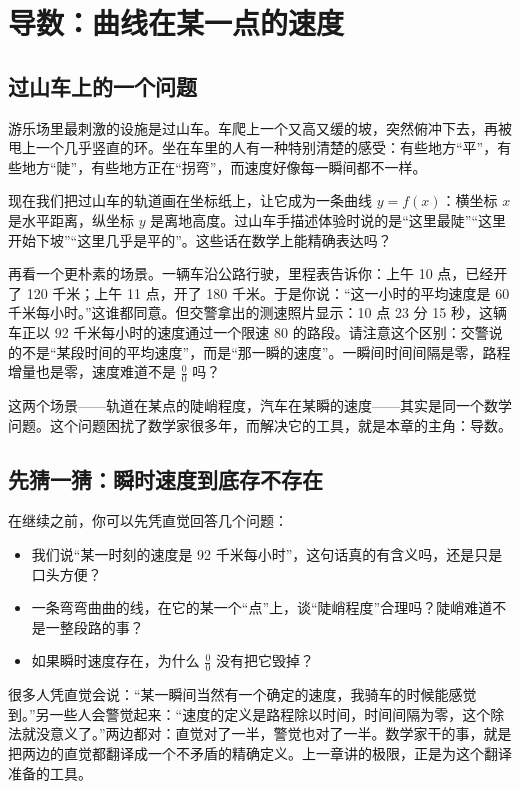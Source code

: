 \chapter{导数：曲线在某一点的速度}

\section{过山车上的一个问题}

游乐场里最刺激的设施是过山车。车爬上一个又高又缓的坡，突然俯冲下去，再被甩上一个几乎竖直的环。坐在车里的人有一种特别清楚的感受：有些地方“平”，有些地方“陡”，有些地方正在“拐弯”，而速度好像每一瞬间都不一样。

现在我们把过山车的轨道画在坐标纸上，让它成为一条曲线 $y=f(x)$：横坐标 $x$ 是水平距离，纵坐标 $y$ 是离地高度。过山车手描述体验时说的是“这里最陡”“这里开始下坡”“这里几乎是平的”。这些话在数学上能精确表达吗？

再看一个更朴素的场景。一辆车沿公路行驶，里程表告诉你：上午 10 点，已经开了 120 千米；上午 11 点，开了 180 千米。于是你说：“这一小时的平均速度是 60 千米每小时。”这谁都同意。但交警拿出的测速照片显示：10 点 23 分 15 秒，这辆车正以 92 千米每小时的速度通过一个限速 80 的路段。请注意这个区别：交警说的不是“某段时间的平均速度”，而是“那一瞬的速度”。一瞬间时间间隔是零，路程增量也是零，速度难道不是 $\frac{0}{0}$ 吗？

这两个场景——轨道在某点的陡峭程度，汽车在某瞬的速度——其实是同一个数学问题。这个问题困扰了数学家很多年，而解决它的工具，就是本章的主角：导数。

\section{先猜一猜：瞬时速度到底存不存在}

在继续之前，你可以先凭直觉回答几个问题：

\begin{itemize}
  \item 我们说“某一时刻的速度是 92 千米每小时”，这句话真的有含义吗，还是只是口头方便？
  \item 一条弯弯曲曲的线，在它的某一个“点”上，谈“陡峭程度”合理吗？陡峭难道不是一整段路的事？
  \item 如果瞬时速度存在，为什么 $\frac{0}{0}$ 没有把它毁掉？
\end{itemize}

很多人凭直觉会说：“某一瞬间当然有一个确定的速度，我骑车的时候能感觉到。”另一些人会警觉起来：“速度的定义是路程除以时间，时间间隔为零，这个除法就没意义了。”两边都对：直觉对了一半，警觉也对了一半。数学家干的事，就是把两边的直觉都翻译成一个不矛盾的精确定义。上一章讲的极限，正是为这个翻译准备的工具。

